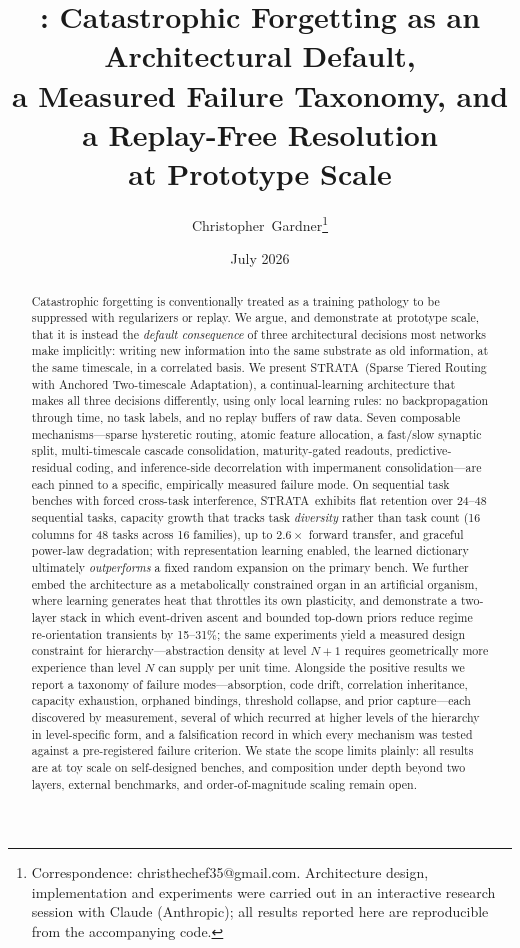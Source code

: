 \documentclass[11pt]{article}
\title{\strata: Catastrophic Forgetting as an Architectural Default,\\
a Measured Failure Taxonomy, and a Replay-Free Resolution\\
at Prototype Scale}
\author{Christopher~Gardner\thanks{Correspondence:
christhechef35@gmail.com. Architecture design, implementation and
experiments were carried out in an interactive research session with
Claude (Anthropic); all results reported here are reproducible from the
accompanying code.}}
\date{July 2026}
\newcommand{\strata}{STRATA}
\begin{document}
\maketitle

\begin{abstract}
Catastrophic forgetting is conventionally treated as a training pathology to
be suppressed with regularizers or replay. We argue, and demonstrate at
prototype scale, that it is instead the \emph{default consequence} of three
architectural decisions most networks make implicitly: writing new
information into the same substrate as old information, at the same
timescale, in a correlated basis. We present \strata\ (Sparse Tiered Routing
with Anchored Two-timescale Adaptation), a continual-learning architecture
that makes all three decisions differently, using only local learning rules:
no backpropagation through time, no task labels, and no replay buffers of
raw data. Seven composable mechanisms---sparse hysteretic routing,
atomic feature allocation, a fast/slow synaptic split, multi-timescale
cascade consolidation, maturity-gated readouts, predictive-residual coding,
and inference-side decorrelation with impermanent consolidation---are each
pinned to a specific, empirically measured failure mode. On sequential
task benches with forced cross-task interference, \strata\ exhibits flat
retention over 24--48 sequential tasks, capacity growth that tracks task
\emph{diversity} rather than task count (16 columns for 48 tasks across 16
families), up to $2.6\times$ forward transfer, and graceful power-law
degradation; with representation learning enabled, the learned dictionary
ultimately \emph{outperforms} a fixed random expansion on the primary
bench.
We further embed the architecture as a metabolically constrained organ in an
artificial organism, where learning generates heat that throttles its own
plasticity, and demonstrate a two-layer stack in which event-driven ascent
and bounded top-down priors reduce regime re-orientation transients by
15--31\%; the same experiments yield a measured design constraint for
hierarchy---abstraction density at level $N{+}1$ requires geometrically
more experience than level $N$ can supply per unit time. Alongside the
positive results we report a taxonomy of failure modes---absorption, code
drift, correlation inheritance, capacity exhaustion, orphaned bindings,
threshold collapse, and prior capture---each discovered by measurement,
several of which recurred at higher levels of the hierarchy in
level-specific form, and a falsification record in which every mechanism
was tested against a pre-registered failure criterion. We state the scope
limits plainly: all results are at toy scale on self-designed benches, and
composition under depth beyond two layers, external benchmarks, and
order-of-magnitude scaling remain open.
\end{abstract}
\end{document}
